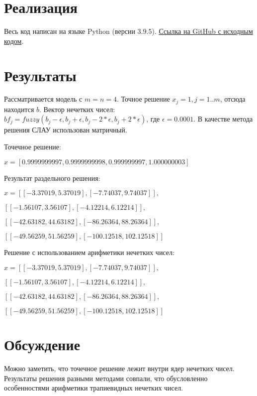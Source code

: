 \documentclass[a4paper,12pt]{article}
\begin{document}
    \section{Реализация}
    \quad Весь код написан на языке Python (версии 3.9.5).
    \href{https://github.com/BoIlAl/Intervals/tree/master/course}{Ссылка на GitHub с исходным кодом}.

    \section{Результаты}
    \quad Рассматривается модель с $ m = n = 4 $. Точное решение $ x_j = 1, j = 1..m $, отсюда находится  $ b $. Вектор нечетких чисел: $ bf_j = fuzzy(b_j - \epsilon, b_j + \epsilon, b_j - 2 * \epsilon, b_j + 2 * \epsilon) $, где $ \epsilon = 0.0001 $. В качестве метода решения СЛАУ использован матричный.

    Точечное решение:

    $ x = [0.9999999997, 0.9999999998, 0.999999997, 1.000000003] $

    Результат раздельного решения:

    $ x = [[-3.37019, 5.37019], [-7.74037, 9.74037]], $
    
    $ [[-1.56107, 3.56107], [-4.12214, 6.12214]], $
    
    $ [[-42.63182, 44.63182], [-86.26364, 88.26364]], $
    
    $ [[-49.56259, 51.56259], [-100.12518, 102.12518]] $

    Решение с использованием арифметики нечетких чисел:

    $ x = [[-3.37019, 5.37019], [-7.74037, 9.74037]], $
    
    $ [[-1.56107, 3.56107], [-4.12214, 6.12214]], $
    
    $ [[-42.63182, 44.63182], [-86.26364, 88.26364]], $
    
    $ [[-49.56259, 51.56259], [-100.12518, 102.12518]] $
    
    \section{Обсуждение}
    \quad Можно заметить, что точечное решение лежит внутри ядер нечетких чисел.
    Результаты решения разными методами совпали, что обусловленно особенностями арифметики трапиевидных нечетких чисел.
\end{document}
